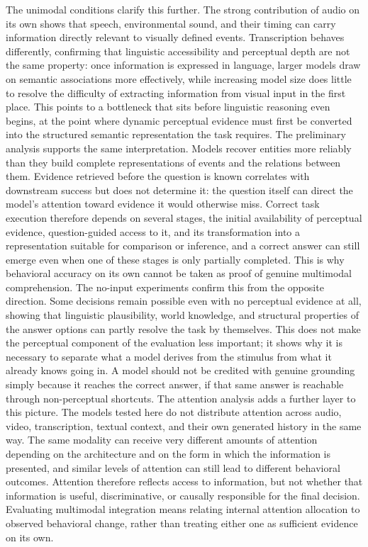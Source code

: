 The unimodal conditions clarify this further. The strong contribution of audio on its own shows that speech, environmental sound, and their timing can carry information directly relevant to visually defined events. Transcription behaves differently, confirming that linguistic accessibility and perceptual depth are not the same property: once information is expressed in language, larger models draw on semantic associations more effectively, while increasing model size does little to resolve the difficulty of extracting information from visual input in the first place. This points to a bottleneck that sits before linguistic reasoning even begins, at the point where dynamic perceptual evidence must first be converted into the structured semantic representation the task requires.
The preliminary analysis supports the same interpretation. Models recover entities more reliably than they build complete representations of events and the relations between them. Evidence retrieved before the question is known correlates with downstream success but does not determine it: the question itself can direct the model's attention toward evidence it would otherwise miss. Correct task execution therefore depends on several stages, the initial availability of perceptual evidence, question-guided access to it, and its transformation into a representation suitable for comparison or inference, and a correct answer can still emerge even when one of these stages is only partially completed. This is why behavioral accuracy on its own cannot be taken as proof of genuine multimodal comprehension.
The no-input experiments confirm this from the opposite direction. Some decisions remain possible even with no perceptual evidence at all, showing that linguistic plausibility, world knowledge, and structural properties of the answer options can partly resolve the task by themselves. This does not make the perceptual component of the evaluation less important; it shows why it is necessary to separate what a model derives from the stimulus from what it already knows going in. A model should not be credited with genuine grounding simply because it reaches the correct answer, if that same answer is reachable through non-perceptual shortcuts.
The attention analysis adds a further layer to this picture. The models tested here do not distribute attention across audio, video, transcription, textual context, and their own generated history in the same way. The same modality can receive very different amounts of attention depending on the architecture and on the form in which the information is presented, and similar levels of attention can still lead to different behavioral outcomes. Attention therefore reflects access to information, but not whether that information is useful, discriminative, or causally responsible for the final decision. Evaluating multimodal integration means relating internal attention allocation to observed behavioral change, rather than treating either one as sufficient evidence on its own.
